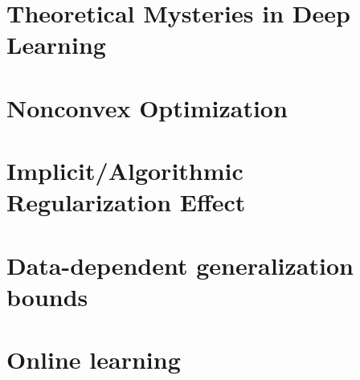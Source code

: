 \documentclass[ebook, oneside, openany]{book}
\theoremstyle{definition}
\theoremstyle{remark}
\numberwithin{section}{chapter}
\numberwithin{equation}{chapter}
\begin{document}
	\chapter{Theoretical Mysteries in Deep Learning}
	
	
	\chapter{Nonconvex Optimization}
	
	
	
	
	\chapter{Implicit/Algorithmic Regularization Effect}
	
	
	
	
	\chapter{Data-dependent generalization bounds}
	
	
	\chapter{Online learning}\label{chap:OL}
	
	
	
	
	\appendix
	
	
	\backmatter
	
	
	
\end{document}
